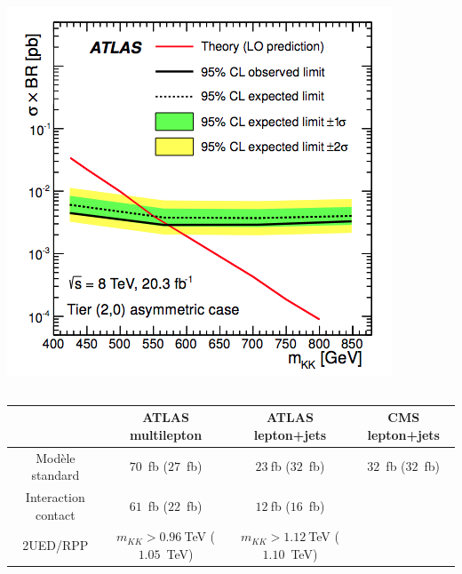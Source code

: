 \begin{frame}
\begin{columns}
\begin{column}{0.4\textwidth}
\begin{center}
\\
\includegraphics[width=0.86\textwidth]{Figures/FourTops/ATLASSingleLeptonResultTier20asym.png}
\end{center}
\end{column}
\end{columns}

\begin{scriptsize}
\begin{table}[htb]
  \begin{center}
\hspace*{-0.5cm}
    \begin{tabular}{|c|c|c|c|}
      \cline{2-4}
\multicolumn{1}{c|}{}   & ATLAS multilepton & ATLAS lepton+jets  & CMS lepton+jets \\ \hline
Modèle standard     & $70$~fb ($27$~fb)  & $23~$fb ($32$~fb) & $32$~fb ($32$~fb)\\ \hline
Interaction contact & $61$~fb ($22$~fb)  & $12~$fb ($16$~fb) & \multicolumn{1}{|c}{}\\ \cline{1-3}
2UED/RPP            & $m_{KK}>0.96~$TeV ($1.05$~TeV) & $m_{KK}>1.12~$TeV ($1.10$~TeV) & \multicolumn{1}{|c}{}\\ \cline{1-3}
    \end{tabular}
 \end{center}
\end{table}
\end{scriptsize}
\end{frame}
